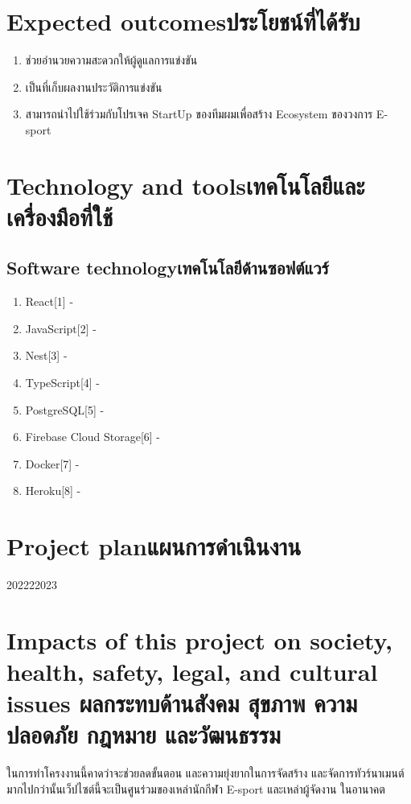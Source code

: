 \section{\ifenglish Expected outcomes\else ประโยชน์ที่ได้รับ\fi}
\begin{enumerate}
    \item ช่วยอำนวยความสะดวกให้ผู้ดูแลการแข่งขัน
    \item เป็นที่เก็บผลงานประวัติการแข่งขัน
    \item สามารถนำไปใช้ร่วมกับโปรเจค StartUp ของทีมผมเพื่อสร้าง Ecosystem ของวงการ E-sport
\end{enumerate}

\section{\ifenglish Technology and tools\else เทคโนโลยีและเครื่องมือที่ใช้\fi}

\subsection{\ifenglish Software technology\else เทคโนโลยีด้านซอฟต์แวร์\fi}
\begin{enumerate}
    \item React[1] -
    \item JavaScript[2] -
    \item Nest[3] -
    \item TypeScript[4] -
    \item PostgreSQL[5] - 
    \item Firebase Cloud Storage[6] -
    \item Docker[7] -
    \item Heroku[8] -
\end{enumerate}

\section{\ifenglish Project plan\else แผนการดำเนินงาน\fi}

\begin{plan}{9}{2022}{2}{2023}
\end{plan}

\section{\ifenglish%
Impacts of this project on society, health, safety, legal, and cultural issues
\else%
ผลกระทบด้านสังคม สุขภาพ ความปลอดภัย กฎหมาย และวัฒนธรรม
\fi}

ในการทำโครงงานนี้คาดว่าจะช่วยลดขั้นตอน และความยุ่งยากในการจัดสร้าง และจัดการทัวร์นาเมนต์
มากไปกว่านั้นเว็ปไซต์นี้จะเป็นศูนร่วมของเหล่านักกีฬา E-sport และเหล่าผู้จัดงาน ในอานาคต
